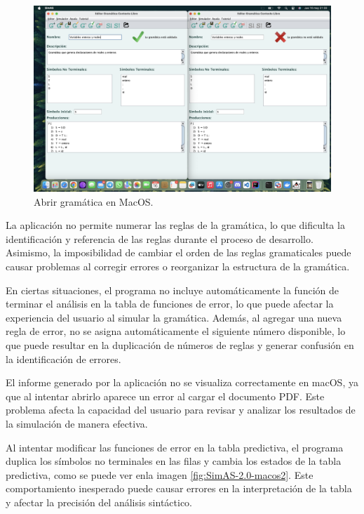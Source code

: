 \begin{figure}[htp]
 	\begin{center}
      \includegraphics[scale=0.3]{figuras/Cap3/SimAS2/fallos/macos1.png} 
       \caption{Abrir gramática en MacOS.}\label{fig:SimAS-2.0-macos1}
 	\end{center}
\end{figure}

La aplicación no permite numerar las reglas de la gramática, lo que dificulta la identificación y referencia de las reglas durante el proceso de desarrollo. Asimismo, la imposibilidad de cambiar el orden de las reglas gramaticales puede causar problemas al corregir errores o reorganizar la estructura de la gramática.

En ciertas situaciones, el programa no incluye automáticamente la función de terminar el análisis en la tabla de funciones de error, lo que puede afectar la experiencia del usuario al simular la gramática. Además, al agregar una nueva regla de error, no se asigna automáticamente el siguiente número disponible, lo que puede resultar en la duplicación de números de reglas y generar confusión en la identificación de errores.

El informe generado por la aplicación no se visualiza correctamente en macOS, ya que al intentar abrirlo aparece un error al cargar el documento PDF. Este problema afecta la capacidad del usuario para revisar y analizar los resultados de la simulación de manera efectiva.

Al intentar modificar las funciones de error en la tabla predictiva, el programa duplica los símbolos no terminales en las filas y cambia los estados de la tabla predictiva, como se puede ver enla imagen \ref{fig:SimAS-2.0-macos2}. Este comportamiento inesperado puede causar errores en la interpretación de la tabla y afectar la precisión del análisis sintáctico.

